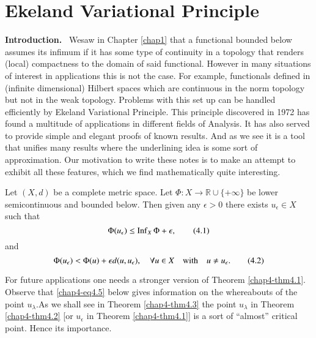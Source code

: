\chapter{Ekeland Variational Principle}\label{chap4}

{\bf Introduction.}~ We\pageoriginale saw in Chapter \ref{chap1} that
a functional bounded below assumes its infimum if it has some type of
continuity in a topology that renders (local) compactness to the
domain of said functional. However in many situations of interest in
applications this is not the case. For example, functionals defined in
(infinite dimensional) Hilbert spaces which are continuous in the norm
topology but not in the weak topology. Problems with this set up can
be handled efficiently by Ekeland Variational Principle. This
principle discovered in 1972 has found a multitude of applications in
different fields of Analysis. It has also served to provide simple and
elegant proofs of known results. And as we see it is a tool that
unifies many results where the underlining idea is some sort of
approximation. Our motivation to write these notes is to make an
attempt to exhibit all these features, which we find mathematically
quite interesting.

\begin{theorem}\label{chap4-thm4.1}
Let $(X,d)$ be a complete metric space. Let $\Phi:X\to \mathbb{R}\cup
\{+\infty\}$ be lower semicontinuous and bounded below. Then given any
$\epsilon>0$ there exists $u_{\epsilon}\in X$ such that
\begin{equation*}
\Phi(u_{\epsilon})\leq \operatorname{Inf}_{X}\Phi+\epsilon,\tag{4.1}\label{chap4-eq4.1}
\end{equation*}
and
\begin{equation*}
\Phi(u_{\epsilon})<\Phi(u)+\epsilon d(u,u_{\epsilon}),\quad \forall u\in
X\quad \text{with}\quad u\neq u_{\epsilon}.\tag{4.2}\label{chap4-eq4.2}
\end{equation*}
\end{theorem}

For future applications one needs a stronger version of Theorem
\ref{chap4-thm4.1}. Observe that \eqref{chap4-eq4.5} below gives
information on the whereabouts of the point
$u_{\lambda}$.\pageoriginale As we shall see in Theorem
\ref{chap4-thm4.3} the point $u_{\lambda}$ in Theorem
\ref{chap4-thm4.2} [or $u_{\epsilon}$ in Theorem \ref{chap4-thm4.1}]
is a sort of ``almost'' critical point. Hence its importance.

